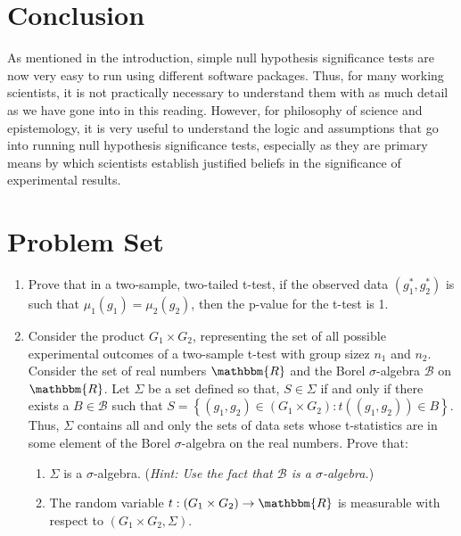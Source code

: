 \documentclass[11pt]{article}
\theoremstyle{definition}
\theoremstyle{remark}
\begin{document}
\section{Conclusion}
As mentioned in the introduction, simple null hypothesis significance tests are now very easy to run using different software packages. Thus, for many working scientists, it is not practically necessary to understand them with as much detail as we have gone into in this reading. However, for philosophy of science and epistemology, it is very useful to understand the logic and assumptions that go into running null hypothesis significance tests, especially as they are primary means by which scientists establish justified beliefs in the significance of experimental results.\par 

\section*{Problem Set}

\begin{enumerate}
\item Prove that in a two-sample, two-tailed t-test, if the observed data $(g^{*}_{1},g^{*}_{2})$ is such that $\mu_{1}(g_{1})=\mu_{2}(g_{2})$, then the p-value for the t-test is 1.



\item Consider the product $G_{1}\times G_{2}$, representing the set of all possible experimental outcomes of a two-sample t-test with group sizez $n_{1}$ and $n_{2}$. Consider the set of real numbers $\mathbbm{R}$ and the Borel $\sigma$-algebra $\mathcal{B}$ on $\mathbbm{R}$. Let $\Sigma$ be a set defined so that, $S\in\Sigma$ if and only if there exists a $B\in\mathcal{B}$ such that $S=\left\{(g_{1},g_{2})\in(G_{1}\times G_{2}):t((g_{1},g_{2}))\in B\right\}$. Thus, $\Sigma$ contains all and only the sets of data sets whose t-statistics are in some element of the Borel $\sigma$-algebra on the real numbers. Prove that:
\begin{enumerate}
    \item $\Sigma$ is a $\sigma$-algebra. (\textit{Hint: Use the fact that $\mathcal{B}$ is a $\sigma$-algebra.})

    \item The random variable $t:(G_{1}\times G_{2})\rightarrow\mathbbm{R}$ is measurable with respect to $(G_{1}\times G_{2},\Sigma)$.
\end{enumerate}

\end{enumerate}
\end{document}

